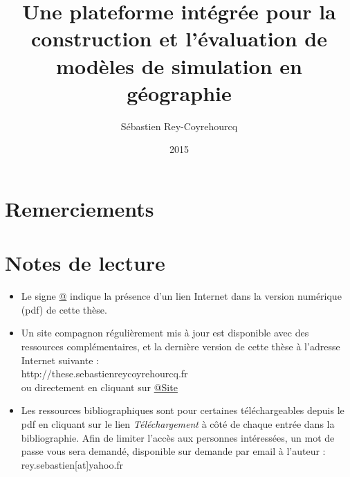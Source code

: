 \documentclass[a4paper, 11pt, openany, openright]{memoir}
\title{Une plateforme intégrée pour la construction et l'évaluation de modèles de simulation en géographie}
\author{Sébastien Rey-Coyrehourcq}
\date{2015}
\makeatletter
\newcommand{\FrameTitle}[2]{%
\fboxrule=\FrameRule \fboxsep=\FrameSep
\fbox{\vbox{\nobreak \vskip -0.7\FrameSep
\rlap{\strut#1}\nobreak\nointerlineskip%
\vskip 0.7\FrameSep
\hbox{#2}}}}
\newenvironment{framewithtitle}[2][\FrameFirst@Lab\ (cont.)]{%
\def\FrameFirst@Lab{\textbf{#2}}%
\def\FrameCont@Lab{\textbf{#1}}%
\def\FrameCommand##1{%
\FrameTitle{\FrameFirst@Lab}{##1}}%
\def\FirstFrameCommand##1{%
\FrameTitle{\FrameFirst@Lab}{##1}}%
\def\MidFrameCommand##1{%
\FrameTitle{\FrameCont@Lab}{##1}}%
\def\LastFrameCommand##1{%
\FrameTitle{\FrameCont@Lab}{##1}}%
\MakeFramed{\advance\hsize-\width \FrameRestore}}%
{\endMakeFramed}
\def@{\color{BurntOrange}\svat\tilblank}
\makeatother
\begin{document}
\begin{titlingpage}
  \maketitle
\end{titlingpage}

\frontmatter

\cleardoublepage
{}
{}
\chapter*{Remerciements}



\cleardoublepage

{}
\chapter*{Notes de lecture}

\begin{framewithtitle}{}{}
\begin{itemize}
  \item Le signe \href{http://www.google.fr}{@} indique la présence d'un lien Internet dans la version numérique (pdf) de cette thèse.

  \item Un site compagnon régulièrement mis à jour est disponible avec des ressources complémentaires, et la dernière version de cette thèse à l'adresse Internet suivante : 
  \\ http://these.sebastienreycoyrehourcq.fr 
  \\ ou directement en cliquant sur \href{http://these.sebastienreycoyrehourcq.fr}{@Site}

  \item Les ressources bibliographiques sont pour certaines téléchargeables depuis le pdf en cliquant sur le lien \textit{Téléchargement} à côté de chaque entrée dans la bibliographie. Afin de limiter l'accès aux personnes intéressées, un mot de passe vous sera demandé, disponible sur demande par email à l'auteur : \\ rey.sebastien[at]yahoo.fr
\end{itemize}

\end{framewithtitle}

\cleardoublepage

\end{document}
